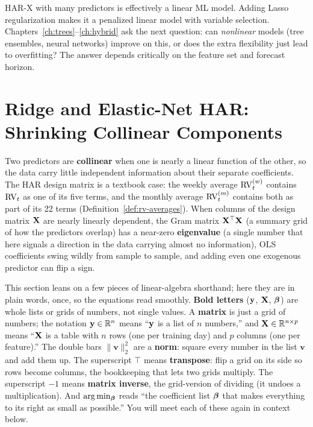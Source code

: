\begin{keyidea}
HAR-X with many predictors is effectively a linear ML model.
Adding Lasso regularization makes it a penalized linear model with variable selection.
Chapters~\ref{ch:trees}--\ref{ch:hybrid} ask the next question: can \emph{nonlinear} models (tree ensembles, neural networks) improve on this, or does the extra flexibility just lead to overfitting?
The answer depends critically on the feature set and forecast horizon.
\end{keyidea}


\section{Ridge and Elastic-Net HAR: Shrinking Collinear Components}
\label{sec:ridge-enet-har}

\begin{prereq}
Two predictors are \textbf{collinear} when one is nearly a linear function of the other, so the data carry little independent information about their separate coefficients.
The HAR design matrix is a textbook case: the weekly average $\operatorname{RV}^{(w)}_t$ contains $\operatorname{RV}_t$ as one of its five terms, and the monthly average $\operatorname{RV}^{(m)}_t$ contains both as part of its 22 terms (Definition~\ref{def:rv-averages}).
When columns of the design matrix $\mathbf{X}$ are nearly linearly dependent, the Gram matrix $\mathbf{X}^\top\mathbf{X}$ (a summary grid of how the predictors overlap) has a near-zero \textbf{eigenvalue} (a single number that here signals a direction in the data carrying almost no information), OLS coefficients swing wildly from sample to sample, and adding even one exogenous predictor can flip a sign.
\end{prereq}

\begin{intuition}
This section leans on a few pieces of linear-algebra shorthand; here they are in plain words, once, so the equations read smoothly.
\textbf{Bold letters} ($\mathbf{y}$, $\mathbf{X}$, $\bm{\beta}$) are whole lists or grids of numbers, not single values.
A \textbf{matrix} is just a grid of numbers; the notation $\mathbf{y} \in \mathbb{R}^n$ means ``$\mathbf{y}$ is a list of $n$ numbers,'' and $\mathbf{X} \in \mathbb{R}^{n\times p}$ means ``$\mathbf{X}$ is a table with $n$ rows (one per training day) and $p$ columns (one per feature).''
The double bars $\lVert\mathbf{v}\rVert_2^2$ are a \textbf{norm}: square every number in the list $\mathbf{v}$ and add them up.
The superscript $\top$ means \textbf{transpose}: flip a grid on its side so rows become columns, the bookkeeping that lets two grids multiply.
The superscript $-1$ means \textbf{matrix inverse}, the grid-version of dividing (it undoes a multiplication).
And $\arg\min_{\bm{\beta}}$ reads ``the coefficient list $\bm{\beta}$ that makes everything to its right as small as possible.''
You will meet each of these again in context below.
\end{intuition}


